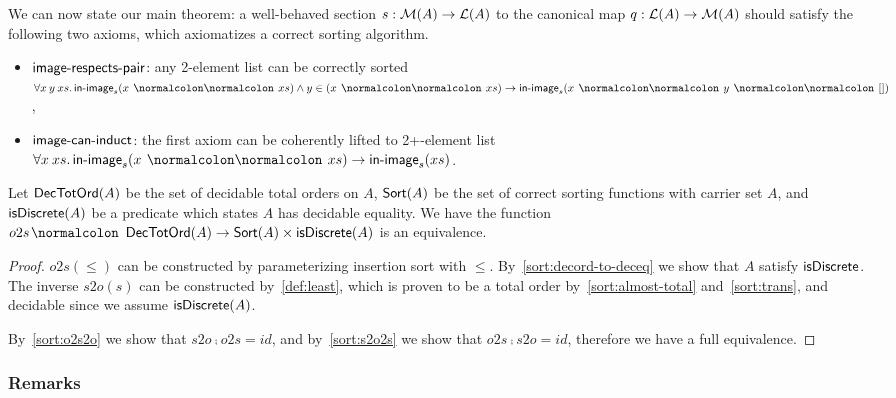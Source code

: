 We can now state our main theorem: a well-behaved section $s : \mathcal{M}(A) \to \mathcal{L}(A)$ to
the canonical map $q : \mathcal{L}(A) \to \mathcal{M}(A)$ should satisfy the following two axioms,
which axiomatizes a correct sorting algorithm.
\begin{definition}
    \leavevmode
    \begin{itemize}[leftmargin=*]
        \item $\operatorname{\mathsf{image-respects-pair}}$: any 2-element list can be correctly sorted\\
              \(
              \forall x \: y \: xs. \issorted(x \cons xs) \land y \in (x \cons xs) \to \issorted(x \cons y \cons [])
              \),
        \item $\operatorname{\mathsf{image-can-induct}}$: the first axiom can be coherently lifted to 2+-element list\\
              \(
              \forall x \: xs. \issorted(x \cons xs) \to \issorted(xs)
              \).
    \end{itemize}
\end{definition}
\begin{theorem}\label{sort:main}
    Let $\operatorname{\mathsf{DecTotOrd}}(A)$ be the set of decidable total orders on $A$,
    $\operatorname{\mathsf{Sort}}(A)$ be the set of correct sorting functions with carrier set $A$,
    and $\operatorname{\mathsf{isDiscrete}}(A)$ be a predicate which states $A$ has decidable equality.
    We have the function $o2s \colon \term{DecTotOrd}(A) \to \term{Sort}(A) \times \term{isDiscrete}(A)$
    is an equivalence.
\end{theorem}
\begin{proof}
    $o2s(\leq)$ can be constructed by parameterizing insertion sort with $\leq$.
    By~\cref{sort:decord-to-deceq} we show that $A$ satisfy $\operatorname{\mathsf{isDiscrete}}$.
    The inverse $s2o(s)$ can be constructed by~\cref{def:least}, which is proven to be
    a total order by~\cref{sort:almost-total} and~\cref{sort:trans}, and decidable
    since we assume $\operatorname{\mathsf{isDiscrete}}(A)$.

    By~\cref{sort:o2s2o} we show that $s2o \comp o2s = id$, and by~\cref{sort:s2o2s}
    we show that $o2s \comp s2o = id$, therefore we have a full equivalence.
\end{proof}

\subsubsection*{Remarks}

